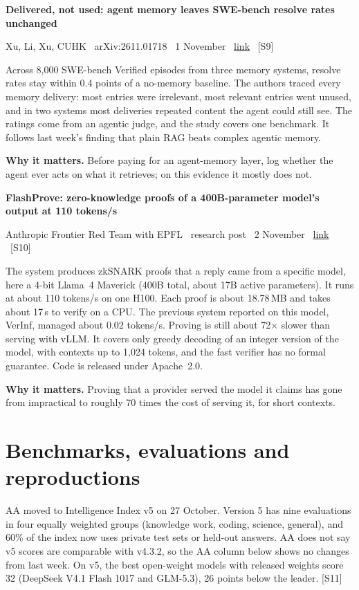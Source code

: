 \documentclass[11pt,a4paper]{article}
\newcommand{\entry}[4]{%
  \par\Needspace{7\baselineskip}\vspace{0.7em}%
  {\sffamily\bfseries\color{brandink}#1}\par
  {\footnotesize\color{brandgrey}#2 \textbullet\ \href{#3}{link} \textbullet\ \srcref{#4}}\par
  \vspace{0.15em}}
\newcommand{\why}[1]{\par{\small\textbf{Why it matters.} #1}\par}
\newcommand{\srcref}[1]{\textcolor{brandaccent}{[S#1]}}
\begin{document}
\entry{Delivered, not used: agent memory leaves SWE-bench resolve rates unchanged}{Xu, Li, Xu, CUHK \textbullet\ arXiv:2611.01718 \textbullet\ 1 November}{https://arxiv.org/abs/2611.01718}{9}
Across 8,000 SWE-bench Verified episodes from three memory systems, resolve rates stay within 0.4 points of a no-memory baseline. The authors traced every memory delivery: most entries were irrelevant, most relevant entries went unused, and in two systems most
deliveries repeated content the agent could still see. The ratings come from an agentic judge, and the study covers one benchmark. It follows last week's finding that plain RAG beats complex agentic memory.
\why{Before paying for an agent-memory layer, log whether the agent ever acts on what it retrieves; on this evidence it mostly does not.}

\entry{FlashProve: zero-knowledge proofs of a 400B-parameter model's output at 110 tokens/s}{Anthropic Frontier Red Team with EPFL \textbullet\ research post \textbullet\ 2 November}{https://www.anthropic.com/research/provable-inference}{10}
The system produces zkSNARK proofs that a reply came from a specific model, here a 4-bit Llama~4 Maverick (400B total, about 17B active parameters). It runs at about 110 tokens/s on one H100. Each proof is about 18.78\,MB and takes about 17\,s to verify on a CPU.
The previous system reported on this model, VerInf, managed about 0.02 tokens/s. Proving is still about 72$\times$ slower than serving with vLLM. It covers only greedy decoding of an integer version of the model, with contexts up to 1,024 tokens, and the fast verifier has no formal guarantee. Code is released under Apache~2.0.
\why{Proving that a provider served the model it claims has gone from impractical to roughly 70 times the cost of serving it, for short contexts.}

\section{Benchmarks, evaluations and reproductions}

AA moved to Intelligence Index v5 on 27 October. Version 5 has nine evaluations in four equally weighted groups (knowledge work, coding, science, general), and 60\% of the index now uses private test sets or held-out answers.
AA does not say v5 scores are comparable with v4.3.2, so the AA column below shows no changes from last week. On v5, the best open-weight models with released weights score 32 (DeepSeek V4.1 Flash 1017 and GLM-5.3), 26 points below the leader. \srcref{11}
\end{document}
